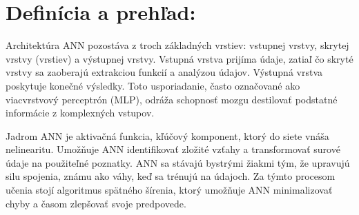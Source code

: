 \documentclass[10pt,twoside,slovak,a4paper]{article}
\begin{document}
\section{Definícia a prehľad:} \label{nejaka} \cite{mahanta2017introduction}

Architektúra ANN pozostáva z troch základných vrstiev: vstupnej vrstvy, skrytej vrstvy (vrstiev) a výstupnej vrstvy. Vstupná vrstva prijíma údaje, zatiaľ čo skryté vrstvy sa zaoberajú extrakciou funkcií a analýzou údajov. Výstupná vrstva poskytuje konečné výsledky. Toto usporiadanie, často označované ako viacvrstvový perceptrón (MLP), odráža schopnosť mozgu destilovať podstatné informácie z komplexných vstupov.

Jadrom ANN je aktivačná funkcia, kľúčový komponent, ktorý do siete vnáša nelinearitu. Umožňuje ANN identifikovať zložité vzťahy a transformovať surové údaje na použiteľné poznatky. ANN sa stávajú bystrými žiakmi tým, že upravujú silu spojenia, známu ako váhy, keď sa trénujú na údajoch. Za týmto procesom učenia stojí algoritmus spätného šírenia, ktorý umožňuje ANN minimalizovať chyby a časom zlepšovať svoje predpovede.
\end{document}
